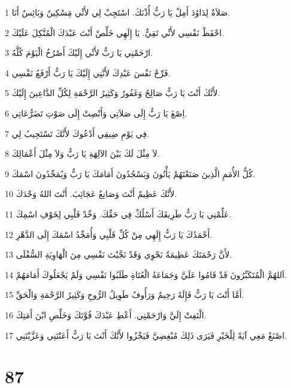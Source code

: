 \par 1 صَلاَةٌ لِدَاوُدَ أَمِلْ يَا رَبُّ أُذْنَكَ. اسْتَجِبْ لِي لأَنِّي مَِسْكِينٌ وَبَائِسٌ أَنَا.
\par 2 احْفَظْ نَفْسِي لأَنِّي تَقِيٌّ. يَا إِلَهِي خَلِّصْ أَنْتَ عَبْدَكَ الْمُتَّكِلَ عَلَيْكَ.
\par 3 ارْحَمْنِي يَا رَبُّ لأَنِّي إِلَيْكَ أَصْرُخُ الْيَوْمَ كُلَّهُ.
\par 4 فَرِّحْ نَفْسَ عَبْدِكَ لأَنَّنِي إِلَيْكَ يَا رَبُّ أَرْفَعُ نَفْسِي.
\par 5 لأَنَّكَ أَنْتَ يَا رَبُّ صَالِحٌ وَغَفُورٌ وَكَثِيرُ الرَّحْمَةِ لِكُلِّ الدَّاعِينَ إِلَيْكَ.
\par 6 اِصْغَ يَا رَبُّ إِلَى صَلاَتِي وَأَنْصِتْ إِلَى صَوْتِ تَضَرُّعَاتِي.
\par 7 فِي يَوْمِ ضِيقِي أَدْعُوكَ لأَنَّكَ تَسْتَجِيبُ لِي.
\par 8 لاَ مِثْلَ لَكَ بَيْنَ الآلِهَةِ يَا رَبُّ وَلاَ مِثْلَ أَعْمَالِكَ.
\par 9 كُلُّ الأُمَمِ الَّذِينَ صَنَعْتَهُمْ يَأْتُونَ وَيَسْجُدُونَ أَمَامَكَ يَا رَبُّ وَيُمَجِّدُونَ اسْمَكَ.
\par 10 لأَنَّكَ عَظِيمٌ أَنْتَ وَصَانِعٌ عَجَائِبَ. أَنْتَ اللهُ وَحْدَكَ.
\par 11 عَلِّمْنِي يَا رَبُّ طَرِيقَكَ أَسْلُكْ فِي حَقِّكَ. وَحِّدْ قَلْبِي لِخَوْفِ اسْمِكَ.
\par 12 أَحْمَدُكَ يَا رَبُّ إِلَهِي مِنْ كُلِّ قَلْبِي وَأُمَجِّدُ اسْمَكَ إِلَى الدَّهْرِ.
\par 13 لأَنَّ رَحْمَتَكَ عَظِيمَةٌ نَحْوِي وَقَدْ نَجَّيْتَ نَفْسِي مِنَ الْهَاوِيَةِ السُّفْلَى.
\par 14 اَللهُمَّ الْمُتَكَبِّرُونَ قَدْ قَامُوا عَلَيَّ وَجَمَاعَةُ الْعُتَاةِ طَلَبُوا نَفْسِي وَلَمْ يَجْعَلُوكَ أَمَامَهُمْ.
\par 15 أَمَّا أَنْتَ يَا رَبُّ فَإِلَهٌ رَحِيمٌ وَرَأُوفٌ طَوِيلُ الرُّوحِ وَكَثِيرُ الرَّحْمَةِ وَالْحَقِّ.
\par 16 الْتَفِتْ إِلَيَّ وَارْحَمْنِي. أَعْطِ عَبْدَكَ قُوَّتَكَ وَخَلِّصِ ابْنَ أَمَتِكَ.
\par 17 اصْنَعْ مَعِي آيَةً لِلْخَيْرِ فَيَرَى ذَلِكَ مُبْغِضِيَّ فَيَخْزُوا لأَنَّكَ أَنْتَ يَا رَبُّ أَعَنْتَنِي وَعَزَّيْتَنِي.

\chapter{87}

